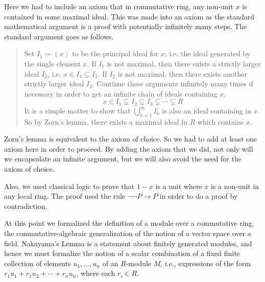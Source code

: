 \documentclass{article}
\begin{document}
Here we had to include an axiom that in commutative ring, any non-unit \(x\) is
contained in some maximal ideal. This was made into an axiom as the standard
mathematical argument is a proof with potentially infinitely many steps. The
standard argument goes as follows.
\begin{quote}
    Set \(I_{1}\coloneqq (x)\) to be the principal ideal for \(x\), i.e. the
    ideal generated by the single element \(x\). If \(I_{1}\) is not maximal,
    then there exists a strictly larger ideal \(I_{2}\), i.e.
    \(x\in I_{1}\subsetneq I_{2}\). If \(I_{2}\) is not maximal, then there
    exists another strictly larger ideal \(I_{3}\). Continue these arguments
    infinitely many times if necessary in order to get an infinite chain of
    ideals containing \(x\).
    \[x\in I_{1}\subsetneq I_{2}\subsetneq I_{3}\subsetneq\cdots\subsetneq R\]
    It is a simple matter to show that \(\bigcup_{k=1}^{\infty} I_{k}\) is also
    an ideal containing in \(x\). So by Zorn's lemma, there exists a maximal
    ideal in \(R\) which contains \(x\).
\end{quote}
Zorn's lemma is equivalent to the axiom of choice. So we had to add at least
one axiom here in order to proceed. By adding the axiom that we did, not only
will we encapsulate an infinite argument, but we will also avoid the need for
the axiom of choice.

Also, we used classical logic to prove that \(1 - x\) is a unit where \(x\) is
a non-unit in any local ring. The proof used the rule \(\neg\neg P\rightarrow
P\) in order to do a proof by contradiction.



At this point we formalized the definition of a module over a commutative ring, the  commutative-algebraic generalization of the notion of a vector
space over a field.  Nakayama's Lemma is a statement about finitely generated modules, and hence we must formalize the notion of a scalar combination of a fixed finite collection of elements $u_1, \ldots, u_n$ of an $R$-module $M$, i.e., expressions of the form  
$r_1 u_1 + r_1 u_2 + \cdots + r_n u_n$, where each $r_i \in R$.
\end{document}
